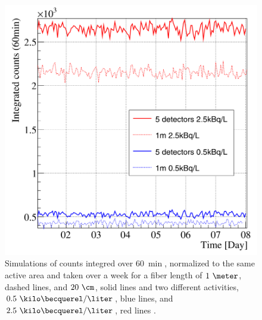 \begin{figure}[h]
\centering
\includegraphics[scale=0.3]{Figures/8SimulationsResults/81TRITIUMDesign/813Length/2DifferentLength.png}
\caption{Simulations of counts integred over $60~\min$, normalized to the same active area and taken over a week for a fiber length of $1~\meter$, dashed lines, and $20~\cm$, solid lines and two different activities, $0.5~\kilo\becquerel/\liter$, blue lines, and $2.5~\kilo\becquerel/\liter$, red lines \cite{SimulationPaperCarlos}. \label{fig:CountsOver60minDifferentLength}}
\end{figure}

